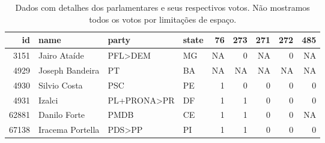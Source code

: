 \begin{table}
\centering
\begin{knitrout}
\color{fgcolor}
\begin{tabular}{r|l|l|l|r|r|r|r|r}
\hline
id & name & party & state & 76 & 273 & 271 & 272 & 485\\
\hline
3151 & Jairo Ataíde & PFL>DEM & MG & NA & 0 & NA & 0 & NA\\
\hline
4929 & Joseph Bandeira & PT & BA & NA & NA & NA & NA & NA\\
\hline
4930 & Silvio Costa & PSC & PE & 1 & 0 & 0 & 0 & 0\\
\hline
4931 & Izalci & PL+PRONA>PR & DF & 1 & 1 & 0 & 0 & 0\\
\hline
62881 & Danilo Forte & PMDB & CE & 1 & 1 & 0 & 0 & NA\\
\hline
67138 & Iracema Portella & PDS>PP & PI & 1 & 1 & 0 & 0 & 0\\
\hline
\end{tabular}


\end{knitrout}
\caption{Dados com detalhes dos parlamentares e seus respectivos votos. Não
mostramos todos os votos por limitações de espaço.}
\label{table:votes}
\end{table}

